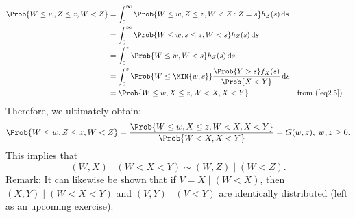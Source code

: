 \begin{Example}
\begin{align*}
        \Prob{W\le w,Z\le z,W<Z}
         & =\int_{0}^{\infty}\Prob{W\le w,Z\le z,W<Z\given Z=s}h_Z(s)\odif{s}                                           \\
         & =\int_{0}^{\infty}\Prob{W\le w, s\le z,W<s}h_Z(s)\odif{s}                                                    \\
         & =\int_{0}^{z}\Prob{W\le w,W<s}h_Z(s)\odif{s}                                                                 \\
         & =\int_{0}^{z}\Prob{W\le \MIN{w,s}}\frac{\Prob{Y>s}f_X(s)}{\Prob{X<Y}}\odif{s}                                \\
         & =\Prob{W\le w,X\le z,W<X,X<Y}                                                 &  & \text{from (\ref{eq2.5})}
    \end{align*}
    Therefore, we ultimately obtain:
    \[ \Prob{W\le w,Z\le z,W<Z}=\frac{\Prob{W\le w,X\le z,W<X,X<Y}}{\Prob{W<X,X<Y}}=G(w,z),\; w,z\ge 0. \]
    This implies that
    \[ (W,X)\mid (W<X<Y) \sim (W,Z)\mid (W<Z). \]
    \underline{Remark}: It can likewise be shown that if $ V=X\mid(W<X) $, then $ (X,Y)\mid(W<X<Y) $ and
    $ (V,Y)\mid(V<Y) $ are identically distributed (left as an upcoming exercise).
\end{Example}
